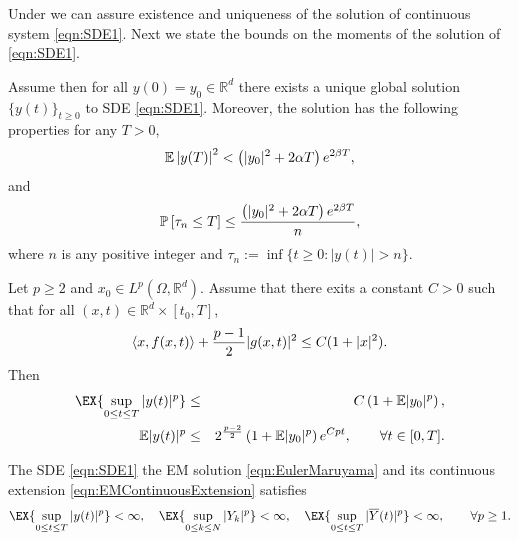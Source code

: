 Under  we can assure  existence and uniqueness 
of the solution of continuous system \eqref{eqn:SDE1}. Next we state  the bounds on the moments
 of the  solution of \eqref{eqn:SDE1}.
%
 \begin{thm}
 	Assume   then for all $y(0)=y_0\in \mathbb{R}^d$   there exists a 
 	unique global solution $\{y(t)\}_{t\geq 0}$ to SDE \eqref{eqn:SDE1}. Moreover, the solution has the 
 	following properties for any $T>0$,
 	\begin{equation*}
 		\mathbb{E}\left|y(T)\right|^2< 
 		\left(
 			|y_0|^2 +2\alpha T 
 		\right)e^{2\beta T},
 	\end{equation*}
 	and
 	\begin{equation*}
 	\mathbb{P}\left[\tau_n\leq T\right]
 	\leq \frac{
 		\left(
 		|y_0|^2 +2\alpha T 
 		\right)
 		e^{2\beta T}
 	}{n},
 	\end{equation*}
 	where $n$ is any positive integer and 
 	$\tau_n := \inf \{ t\geq 0 : |y(t)|>n\}$.
 \end{thm}
\begin{thm}
	\label{thm:MaoCoercive}
	Let $p\geq 2$ and $x_0\in L^p(\Omega, \mathbb{R}^d)$. Assume that there exits a constant $C>0$
	such that for all $(x,t)\in \mathbb{R}^d\times [t_0,T]$,
	\begin{equation*}
	\left\langle x, f(x,t)\right\rangle+\frac{p-1}{2}|g(x,t)|^2 \leq C(1+|x|^2).
	\end{equation*}
	Then
	\begin{eqnarray*}
	\EX{\sup_{0\leq t \leq T}|y(t)|^p}&\leq& C \left(1+\mep{y_0}\right), \nonumber\\
	\m|y(t)|^p
	&\leq&
	2^{\frac{p-2}{2}}
	\left(
	1 + \m|y_0|^p
	\right)e^{Cpt}, \qquad \forall t\in[0,T].
	\end{eqnarray*}
\end{thm}
\begin{hypothesis}\label{ass:MomentBounds}
	The SDE \eqref{eqn:SDE1} the EM solution \eqref{eqn:EulerMaruyama} and its continuous extension 
	\eqref{eqn:EMContinuousExtension} satisfies
	\begin{equation*}
		\EX{
			\sup_{0\leq t\leq T}
			|y(t)|^p	
		}< \infty, \quad
	\EX{
		\sup_{0\leq k \leq N}
			|Y_k|^p	
	}< \infty, \quad
	\EX{
		\sup_{0\leq t\leq T}
		|\overline{Y}(t)|^p	
	} < \infty, \qquad \forall p\geq 1.
	\end{equation*}
\end{hypothesis}


